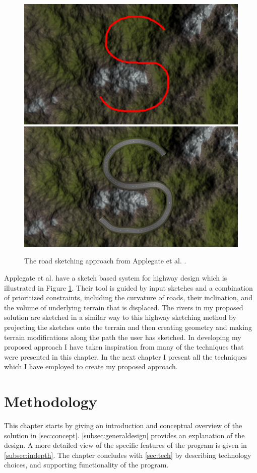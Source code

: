 \documentclass[a4paper,12pt]{report}
\newcommand{\secref}[1]{\autoref{#1}}
\begin{document}
\begin{figure}
\centering
 \includegraphics[width=0.4\linewidth]{thesis/related/applegate.png}
 \includegraphics[width=0.4\linewidth]{thesis/related/applegate2.png}
 \caption{The road sketching approach from Applegate et al. \cite{applegate2011sketch}. }
 \label{fig:applegate}
\end{figure}

Applegate et al. \cite{applegate2011sketch} have a sketch based system for highway design which is illustrated in Figure \ref{fig:applegate}. Their tool is guided by input sketches and a combination of prioritized constraints, including the curvature of roads, their inclination, and the volume of underlying terrain that is displaced. The rivers in my proposed solution are sketched in a similar way to this highway sketching method by projecting the sketches onto the terrain and then creating geometry and making terrain modifications along the path the user has sketched. In developing my proposed approach I have taken inspiration from many of the techniques that were presented in this chapter. In the next chapter I present all the techniques which I have employed to create my proposed approach.

\clearpage


\chapter{Methodology}
\label{sec:method}
This chapter starts by giving an introduction and  conceptual overview of the solution in \secref{sec:concept}. \secref{subsec:generaldesign} provides an explanation of the design. A more detailed view of the specific features of the program is given in \secref{subsec:indepth}. The chapter concludes with \secref{sec:tech} by describing technology choices, and supporting functionality of the program. 
\end{document}
